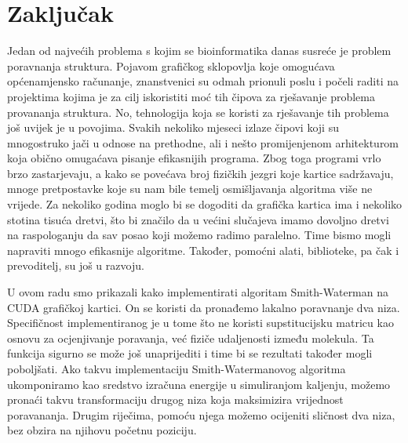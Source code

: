 \documentclass[times, utf8, zavrsni]{fer}
\begin{document}
\chapter{Zaključak}

Jedan od najvećih problema s kojim se bioinformatika danas
susreće je problem poravnanja struktura. Pojavom grafičkog sklopovlja
koje omogućava općenamjensko računanje, znanstvenici su odmah
prionuli poslu i počeli raditi na projektima kojima je za cilj
iskoristiti moć tih čipova za rješavanje problema provananja
struktura. No, tehnologija koja se koristi za rješavanje tih problema
još uvijek je u povojima. Svakih nekoliko mjeseci izlaze
čipovi koji su mnogostruko jači u odnose na prethodne, ali i
nešto promijenjenom arhitekturom koja obično omugaćava pisanje
efikasnijih programa. Zbog toga programi vrlo brzo zastarjevaju,
a kako se povećava broj fizičkih jezgri koje kartice sadržavaju,
mnoge pretpostavke koje su nam bile temelj osmišljavanja algoritma
više ne vrijede. Za nekoliko godina moglo bi se dogoditi da grafička
kartica ima i nekoliko stotina tisuća dretvi, što bi značilo
da u većini slučajeva imamo dovoljno dretvi na raspologanju
da sav posao koji možemo radimo paralelno. Time bismo mogli
napraviti mnogo efikasnije algoritme. Također, pomoćni alati,
biblioteke, pa čak i prevoditelj, su još u razvoju. 

U ovom radu smo prikazali kako implementirati algoritam Smith-Waterman
na CUDA grafičkoj kartici. On se koristi da pronađemo lakalno
poravnanje dva niza. Specifičnost implementiranog je u tome što
ne koristi supstitucijsku matricu kao osnovu za ocjenjivanje
poravanja, već fiziče udaljenosti između molekula. Ta funkcija
sigurno se može još unaprijediti i time bi se rezultati također
mogli poboljšati. Ako takvu implementaciju Smith-Watermanovog algoritma
ukomponiramo kao sredstvo izračuna energije u simuliranjom
ka{\-}lje{\-}nju,
možemo pronaći takvu transformaciju
drugog niza koja maksimizira vrijednost poravananja. Drugim riječima,
pomoću njega možemo ocijeniti sličnost dva niza, bez obzira na 
njihovu početnu poziciju. 

\nocite{*}

{}

\end{document}
